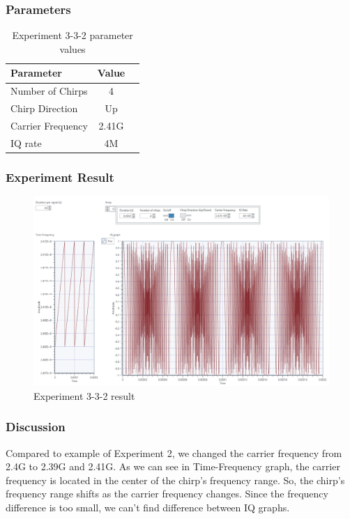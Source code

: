     \subsubsection*{Parameters}
    \begin{table}[!h]\centering
        \hspace{10mm}
        \begin{tabular}{|l|c|c|}
        \hline
        \multicolumn{1}{|l|}{Parameter} & \multicolumn{1}{l|}{Value} \\
        \hline
        Number of Chirps & 4 \\ 
        \hline
        Chirp Direction & Up \\ 
        \hline
        Carrier Frequency & 2.41G \\ 
        \hline
        IQ rate & 4M \\ 
        \hline
        \end{tabular}
        \caption{Experiment 3-3-2 parameter values}
    \end{table}
    
    \subsubsection*{Experiment Result}
    \vspace{-4mm}  
    \begin{figure}[!h]\raggedleft
    \hspace{15mm}
		\includegraphics[width=.95\textwidth]{image/week03/3-3-2.png}
		\caption{\footnotesize Experiment 3-3-2 result}
		\vspace{-10pt}
    \end{figure}
    
    \subsubsection*{Discussion}
    Compared to example of Experiment 2, we changed the carrier frequency from 2.4G to 2.39G and 2.41G. As we can see in Time-Frequency graph, the carrier frequency is located in the center of the chirp’s frequency range. So, the chirp’s frequency range shifts as the carrier frequency changes. Since the frequency difference is too small, we can’t find difference between IQ graphs. \\
\clearpage
    

